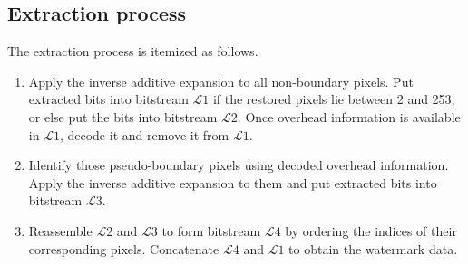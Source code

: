 \documentclass{article}
\begin{document}
\subsection{Extraction process} \label{sec:extract}
The extraction process is itemized as follows.
\begin{enumerate}
  \item Apply the inverse additive expansion to all non-boundary pixels. Put extracted bits into
      bitstream $\mathcal{L}1$ if the restored pixels lie between 2 and 253, or else put the bits
      into bitstream $\mathcal{L}2$. Once overhead information is available in $\mathcal{L}1$,
      decode it and remove it from $\mathcal{L}1$.
  \item Identify those pseudo-boundary pixels using decoded overhead information. Apply the inverse
      additive expansion to them and put extracted bits into bitstream $\mathcal{L}3$.
  \item Reassemble $\mathcal{L}2$ and $\mathcal{L}3$ to form bitstream $\mathcal{L}4$ by ordering
      the indices of their corresponding pixels. Concatenate $\mathcal{L}4$ and $\mathcal{L}1$ to
      obtain the watermark data.
\end{enumerate}
\end{document}
